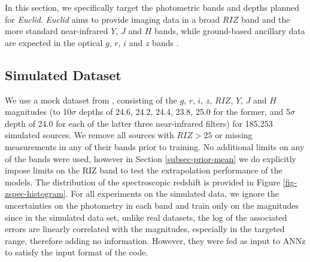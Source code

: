 \documentclass[useAMS,usenatbib,fleqn]{mn2e}
\begin{document}
In this section, we specifically target the photometric bands and depths planned for {\em Euclid}. {\em Euclid} aims to provide imaging data in a broad $RIZ$ band and the more standard near-infrared $Y$, $J$ and $H$ bands, while ground-based ancillary data are expected in the optical $g$, $r$, $i$ and $z$ bands \citep{laureijs2011}. 


\subsection{Simulated Dataset}
\label{sec-dataset}

We use a mock dataset from \citet{jouvel09}, consisting of the $g$, $r$, $i$, $z$, $RIZ$, $Y$, $J$ and $H$ magnitudes (to 10$\sigma$ depths of 24.6, 24.2, 24.4, 23.8, 25.0 for the former, and 5$\sigma$ depth of 24.0 for each of the latter three near-infrared filters) for 185,253 simulated sources. We remove all sources with $RIZ>25$ or missing measurements in any of their bands prior to training. No additional limits on any of the bands were used, however in Section \ref{subsec-prior-mean} we do explicitly impose limits on the RIZ band to test the extrapolation performance of the models. The distribution of the spectroscopic redshift is provided in Figure \ref{fig-zspec-histogram}. For all experiments on the simulated data, we ignore the uncertainties on the photometry in each band and train only on the magnitudes since in the simulated data set, unlike real datasets, the log of the associated errors are linearly correlated with the magnitudes, especially in the targeted range, therefore adding no information. However, they were fed as input to {\sc ANNz} to satisfy the input format of the code.
\end{document}
